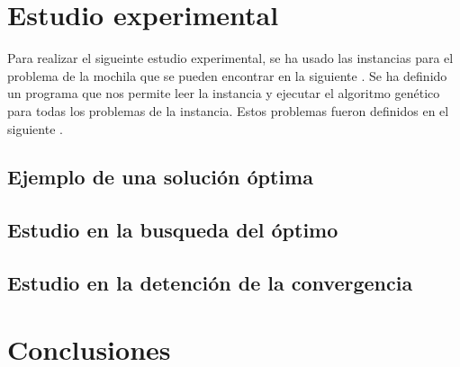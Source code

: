 \documentclass[runningheads]{llncs}
\begin{document}
\section{Estudio experimental}

Para realizar el sigueinte estudio experimental, se ha usado las instancias para el problema de la mochila
que se pueden encontrar en la siguiente \cite{ref_or_library}. Se ha definido un programa que nos permite leer
la instancia y ejecutar el algoritmo genético para todas los problemas de la instancia. Estos problemas fueron
definidos en el siguiente \cite{ref_balas}. 

\subsection{Ejemplo de una solución óptima}

\subsection{Estudio en la busqueda del óptimo}

\subsection{Estudio en la detención de la convergencia}

\section{Conclusiones}


\end{document}
